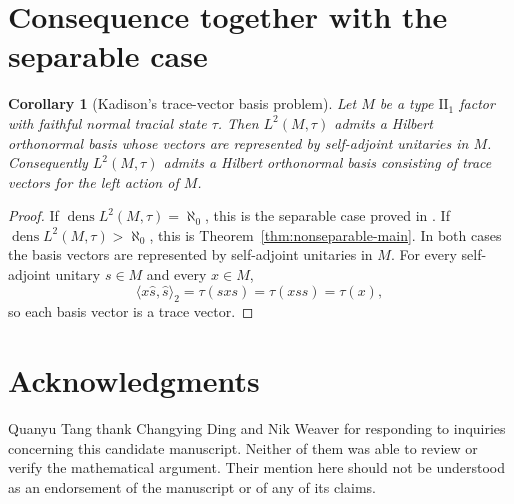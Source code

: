 \documentclass[11pt,letterpaper,reqno]{amsart}
\newtheorem{cor}[thm]{Corollary}
\theoremstyle{definition}
\numberwithin{equation}{section}
\DeclareMathOperator{\dens}{dens}
\begin{document}
\section{Consequence together with the separable case}
\label{sec:consequence}

\begin{cor}[Kadison's trace-vector basis problem]\label{cor:kadison-full}
Let $M$ be a type $\mathrm{II}_1$ factor with faithful normal tracial state
$\tau$.
Then $L^2(M,\tau)$ admits a Hilbert orthonormal basis whose vectors are
represented by self-adjoint unitaries in $M$.  Consequently $L^2(M,\tau)$ admits a Hilbert
orthonormal basis consisting of trace vectors for the left action of $M$.
\end{cor}

\begin{proof}
If $\dens L^2(M,\tau)=\aleph_0$, this is the separable case proved in
\cite{HTZ26}.  If $\dens L^2(M,\tau)>\aleph_0$, this is
Theorem~\ref{thm:nonseparable-main}.  In both cases the basis vectors are
represented by self-adjoint unitaries in $M$.  For every self-adjoint unitary
$s\in M$ and every $x\in M$,
\[
   \langle x\widehat s,\widehat s\rangle_2
   =\tau(sxs)
   =\tau(xss)
   =\tau(x),
\]
so each basis vector is a trace vector.
\end{proof}


\section*{Acknowledgments} 
Quanyu Tang thank Changying Ding and Nik Weaver for responding to inquiries concerning this candidate manuscript. Neither of them was able to review or verify the mathematical argument. Their mention here should not be understood as an endorsement of the manuscript or of any of its claims.
\end{document}
